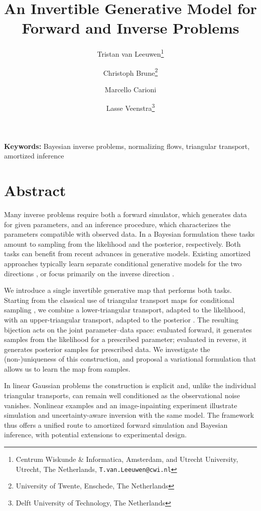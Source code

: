 \documentclass[11pt]{article}
\title{\bfseries An Invertible Generative Model for Forward and Inverse Problems}
\author{
Tristan van Leeuwen\thanks{Centrum Wiskunde \& Informatica, Amsterdam, and
Utrecht University, Utrecht, The Netherlands,
\texttt{T.van.Leeuwen@cwi.nl}}
\and
Christoph Brune\thanks{University of Twente, Enschede, The Netherlands}
\and
Marcello Carioni\footnotemark[2]
\and
Lasse Veenstra\thanks{Delft University of Technology, The Netherlands}
}
\date{}
\begin{document}
\maketitle

\vspace{-1.5em}

\noindent
\textbf{Keywords:}
Bayesian inverse problems, normalizing flows, triangular transport,
amortized inference

\vspace{-0.5em}

\section*{Abstract}
\vspace{-0.5em}

Many inverse problems require both a forward simulator, which generates data
for given parameters, and an inference procedure, which characterizes the
parameters compatible with observed data. In a Bayesian formulation these
tasks amount to sampling from the likelihood and the posterior, respectively. 
Both tasks can benefit from recent advances in generative models. Existing amortized approaches typically learn separate conditional generative models for the two directions
\cite{Radev2023}, or focus primarily on the inverse direction
\cite{Ardizzone2019}.

We introduce a single invertible generative map that performs both tasks.
Starting from the classical use of triangular transport maps for conditional
sampling \cite{Marzouk2017}, we combine a lower-triangular transport, adapted
to the likelihood, with an upper-triangular transport, adapted to the
posterior \cite{vanLeeuwen2026}. The resulting bijection acts on the joint parameter--data space:
evaluated forward, it generates samples from the likelihood for a prescribed
parameter; evaluated in reverse, it generates posterior samples for prescribed
data. We investigate the (non-)uniqueness of this construction, and proposal a variational formulation that allows us to learn the map from samples.

In linear Gaussian problems the construction is explicit and,
unlike the individual triangular transports, can remain well conditioned as
the observational noise vanishes. Nonlinear examples and an image-inpainting
experiment illustrate simulation and uncertainty-aware inversion with the
same model. The framework thus offers a unified route to amortized forward
simulation and Bayesian inference, with potential extensions to experimental
design.
\end{document}
